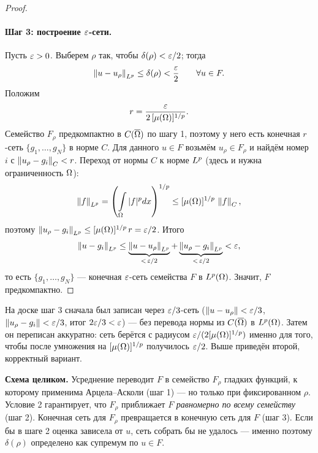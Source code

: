 \begin{proof}
\paragraph{Шаг 3: построение $\varepsilon$-сети.}
Пусть $\varepsilon > 0$. Выберем $\rho$ так, чтобы $\delta(\rho) < \varepsilon/2$; тогда
\[
  \left\lVert u - u_\rho \right\rVert_{L^{p}} \le \delta(\rho) < \frac{\varepsilon}2 \qquad \forall u \in F .
\]
Положим
\[
  r = \frac{\varepsilon}{2\,[\mu(\Omega)]^{1/p}} .
\]
Семейство $F_\rho$ предкомпактно в $C(\overline{\Omega})$ по шагу 1, поэтому у него есть конечная
$r$-сеть $\{g_1, \dots, g_N\}$ в норме $C$. Для данного $u \in F$ возьмём
$u_\rho \in F_\rho$ и найдём номер $i$ с $\left\lVert u_\rho - g_i \right\rVert_{C} < r$.
Переход от нормы $C$ к норме $L^{p}$ (здесь и нужна ограниченность $\Omega$):
\[
  \left\lVert f \right\rVert_{L^{p}} = \left(\int\limits_\Omega |f|^p dx\right)^{1/p}
  \le [\mu(\Omega)]^{1/p}\,\left\lVert f \right\rVert_{C} ,
\]
поэтому $\left\lVert u_\rho - g_i \right\rVert_{L^{p}} \le [\mu(\Omega)]^{1/p}\,r = \varepsilon/2$.
Итого
\[
  \left\lVert u - g_i \right\rVert_{L^{p}}
  \le \underbrace{\left\lVert u - u_\rho \right\rVert_{L^{p}}}_{<\,\varepsilon/2}
    + \underbrace{\left\lVert u_\rho - g_i \right\rVert_{L^{p}}}_{<\,\varepsilon/2} < \varepsilon ,
\]
то есть $\{g_1, \dots, g_N\}$ — конечная $\varepsilon$-сеть семейства $F$ в $L^{p}(\Omega)$.
Значит, $F$ предкомпактно.
\end{proof}

\begin{warn}
На доске шаг 3 сначала был записан через $\varepsilon/3$-сеть ($\left\lVert u-u_\rho \right\rVert < \varepsilon/3$,
$\left\lVert u_\rho - g_i \right\rVert < \varepsilon/3$, итог $2\varepsilon/3 < \varepsilon$) — без перевода нормы из $C(\overline{\Omega})$
в $L^{p}(\Omega)$. Затем он переписан аккуратно: сеть берётся с радиусом
$\varepsilon/(2[\mu(\Omega)]^{1/p})$ именно для того, чтобы после умножения на $[\mu(\Omega)]^{1/p}$
получилось $\varepsilon/2$. Выше приведён второй, корректный вариант.
\end{warn}

\begin{idea}
\textbf{Схема целиком.} Усреднение переводит $F$ в семейство $F_\rho$ гладких функций,
к которому применима Арцела--Асколи (шаг 1) — но только при фиксированном $\rho$. Условие 2
гарантирует, что $F_\rho$ приближает $F$ \emph{равномерно по всему семейству} (шаг 2).
Конечная сеть для $F_\rho$ превращается в конечную сеть для $F$ (шаг 3). Если бы в шаге 2
оценка зависела от $u$, сеть собрать бы не удалось — именно поэтому $\delta(\rho)$
определено как супремум по $u \in F$.
\end{idea}

